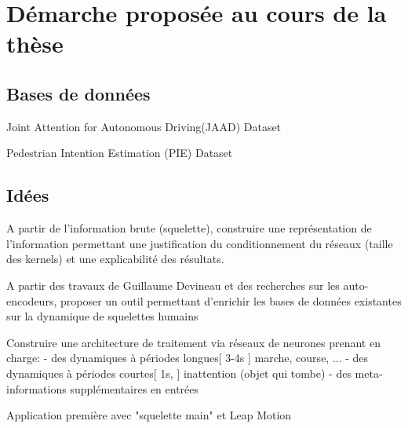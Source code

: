 \clearpage
\section{Démarche proposée au cours de la thèse}
\label{sec:SOTA}

\subsection{Bases de données}
Joint Attention for Autonomous Driving(JAAD) Dataset \cite{2016arXiv160904741K,Rasouli_2017_ICCV}

Pedestrian Intention Estimation (PIE) Dataset \cite{Rasouli2019PIE}

\subsection{Idées}

A partir de l'information brute (squelette), construire une représentation de l'information permettant une justification du conditionnement du réseaux (taille des kernels) et une explicabilité des résultats.

A partir des travaux de Guillaume Devineau et des recherches sur les auto-encodeurs, proposer un outil permettant d'enrichir les bases de données existantes sur la dynamique de squelettes humains


Construire une architecture de traitement via réseaux de neurones prenant en charge:
- des dynamiques à périodes longues[ 3-4s ] marche, course, ...
- des dynamiques à périodes courtes[ 1s, ] inattention (objet qui tombe)
- des meta-informations supplémentaires en entrées

Application première avec "squelette main" et Leap Motion